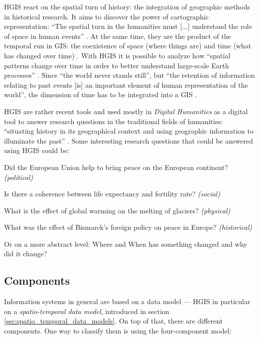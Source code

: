 HGIS react on the spatial turn of history: the integration of geographic methods in historical research. It aims to discover the power of cartographic representation: ``The spatial turn in the humanities must [...] understand the role of space in human events''
\cite{bodenhamer2010spatial}.
At the same time, they are the product of the temporal run in GIS: the coexistence of space (where things are) and time (what has changed over time)
\cite[p. 45]{solana2014spatio}.
With HGIS it is possible to analyze how ``spatial patterns change over time in order to better understand large-scale Earth processes''
\cite{peuquet99}.
Since ``the world never stands still'', but ``the retention of information relating to past events [is] an important element of human representation of the world'', the dimension of time has to be integrated into a GIS
\cite{peuquet99}.

HGIS are rather recent tools and used mostly in \emph{Digital Humanities} as a digital tool to answer research questions in the traditional fields of humanities: ``situating history in its geographical context and using geographic information to illuminate the past''
\cite[p. 3]{knowles2008placing}.
Some interesting research questions that could be answered using HGIS could be:

\begin{compactitem}
  \item Did the European Union help to bring peace on the European continent?
  \hfill \emph{(political)}
  \item Is there a coherence between life expectancy and fertility rate?
  \hfill \emph{(social)}
  \item What is the effect of global warming on the melting of glaciers?
  \hfill \emph{(physical)}
  \item What was the effect of Bismarck's foreign policy on peace in Europe?
  \hfill \emph{(historical)}
\end{compactitem}

Or on a more abstract level: Where and When has something changed and why did it change?


\subsection{Components} %
\label{sub:components}

Information systems in general are based on a data model --- HGIS in particular on a \emph{spatio-temporal data model}, introduced in section \ref{sec:spatio_temporal_data_models}. On top of that, there are different components. One way to classify them is using the four-component model:

